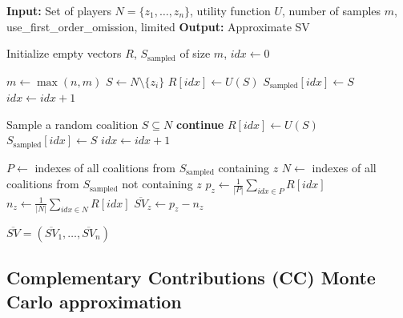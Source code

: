\begin{algorithm}[htbp]
\caption{Monte Carlo (MC)-inspired algorithm for approximation of Shapley values (SV).}
\label{alg:shapley_values__monte_carlo__alg}
\begin{algorithmic}[1]

\State \textbf{Input:} Set of players $N = \{z_1, \dots, z_n\}$, utility function $U$, number of samples $m$,
use\_first\_order\_omission, limited
\State \textbf{Output:} Approximate SV

\State Initialize empty vectors $R$, $S_{\text{sampled}}$ of size $m$, $idx \gets 0$

    \State $m \gets \max{(n, m)}$ 
        \State $S \gets N \setminus \{z_i\}$ 
        \State $R[idx] \gets U(S)$
        \State $S_{\text{sampled}}[idx] \gets S$
        \State $idx \gets idx + 1$
    \EndFor
\EndIf

 
    \State Sample a random coalition $S \subseteq N$
        \State \textbf{continue} 
    \EndIf
    \State $R[idx] \gets U(S)$
    \State $S_{\text{sampled}}[idx] \gets S$
    \State $idx \gets idx + 1$
\EndWhile

 
    \State $P \gets$ indexes of all coalitions from $S_{\text{sampled}}$ containing $z$
    \State $N \gets$ indexes of all coalitions from $S_{\text{sampled}}$ not containing $z$
    \State $p_z \gets \frac{1}{|P|} \sum_{idx \in P} R[idx]$ 
    \State $n_z \gets \frac{1}{|N|} \sum_{idx \in N} R[idx]$ 
    \State $\overline{SV}_z \gets p_z - n_z$
\EndFor

\State \Return $\overline{SV} = (\overline{SV}_1, \dots, \overline{SV}_n)$

\end{algorithmic}
\end{algorithm}

\newpage
\subsection{Complementary Contributions (CC) Monte Carlo approximation}
\label{subsec:shapley_values__complementary}

